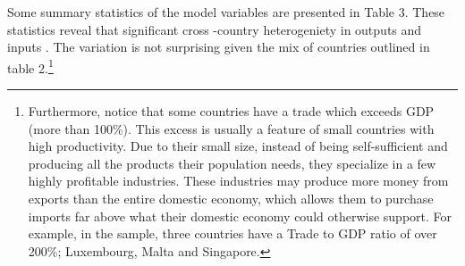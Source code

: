\documentclass[
  10pt,
]{article}
\begin{document}
Some summary statistics of the model variables are presented in Table 3.
These statistics reveal that significant cross -country heterogeniety in outputs and inputs
. The variation is
not surprising given the mix of countries outlined in table 2.\footnote{
Furthermore, notice that some countries have a trade which exceeds GDP
(more than 100\%). This excess is usually a feature of small countries
with high productivity. Due to their small size, instead of being
self-sufficient and producing all the products their population needs,
they specialize in a few highly profitable industries. These industries
may produce more money from exports than the entire domestic economy,
which allows them to purchase imports far above what their domestic
economy could otherwise support. For example, in the sample, three
countries have a Trade to GDP ratio of over 200\%; Luxembourg, Malta and
Singapore.}

\newpage

\begingroup\fontsize{10}{12}\selectfont
\end{document}
